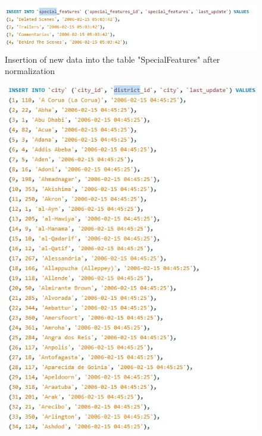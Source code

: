\documentclass{article}
\begin{document}
		\begin{figure}[H]
			\includegraphics[width=\textwidth]{specialfeatures1_insert_norm}
			\caption{Insertion of new data into the table "Special\textunderscore Features" after normalization}
		\end{figure}
		\begin{figure}[H]
			\includegraphics[width=\textwidth]{district1_insert_norm}

\end{figure}
\end{document}
